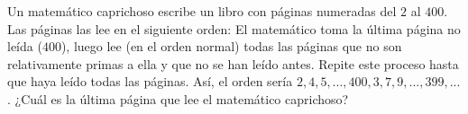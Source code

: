 Un matemático caprichoso escribe un libro con páginas numeradas del $2$ al $400$. Las páginas las lee en el siguiente orden: El matemático toma la última página no leída ($400$), luego lee (en el orden normal) todas las páginas que no son relativamente primas a ella y que no se han leído antes. Repite este proceso hasta que haya leído todas las páginas. Así, el orden sería $2, 4, 5, ... , 400, 3, 7, 9, ... , 399, ...$. ¿Cuál es la última página que lee el matemático caprichoso? 